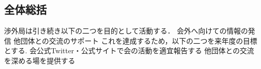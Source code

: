 \subsection*{全体総括}

渉外局は引き続き以下の二つを目的として活動する．
    会外へ向けての情報の発信
    他団体との交流のサポート
これを達成するため，以下の二つを来年度の目標とする.
    会公式Twitter・公式サイトで会の活動を適宜報告する
    他団体との交流を深める場を提供する

